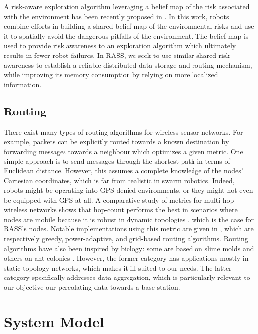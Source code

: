 \documentclass[letterpaper, 10 pt, conference]{ieeeconf}
\begin{document}
A risk-aware exploration algorithm leveraging a belief map of the risk
associated with the environment has been recently proposed in
\cite{vielfaure2021dora}. In this work, robots combine efforts in building a shared belief map of the environmental risks and use it to spatially avoid the dangerous
pitfalls of the environment. The belief map is used to provide risk
awareness to an exploration algorithm which ultimately results in
fewer robot failures. In RASS, we seek to use similar shared risk awareness to establish a reliable distributed data storage and
routing mechanism, while improving its memory consumption by relying on more localized information.

\subsection{Routing}

There exist many types of routing algorithms for wireless sensor
networks. For example, packets can be explicitly routed towards a known destination
by forwarding messages towards a neighbour which optimizes a given
metric. One simple approach is to send messages through the
shortest path in terms of Euclidean distance. However, this assumes a
complete knowledge of the nodes' Cartesian coordinates, which is far
from realistic in swarm robotics. Indeed, robots might be operating
into GPS-denied environments, or they might not even be equipped with
GPS at all. A comparative study of metrics for multi-hop wireless networks shows
that hop-count performs the best in scenarios where nodes are mobile
\cite{draves2004comparison} because it is robust in dynamic topologies
\cite{watteyne2009implementation}, which is the case for RASS's
nodes. Notable implementations using this metric are given in
\cite{kuruvila2005hop,zhang2014efficient,al2019efficient}, which are
respectively greedy, power-adaptive, and grid-based routing algorithms.
Routing algorithms have also been inspired by biology: some are based
on slime molds \cite{li2011slime,jiang2018toward} and others on ant
colonies \cite{jiang2018effective,liao2008data}. However, the
former category has applications mostly in static topology networks,
which makes it ill-suited to our needs. The latter category
specifically addresses data aggregation, which is particularly
relevant to our objective our percolating data towards a base station.


\section{System Model}
\label{systemmodel}
\end{document}
